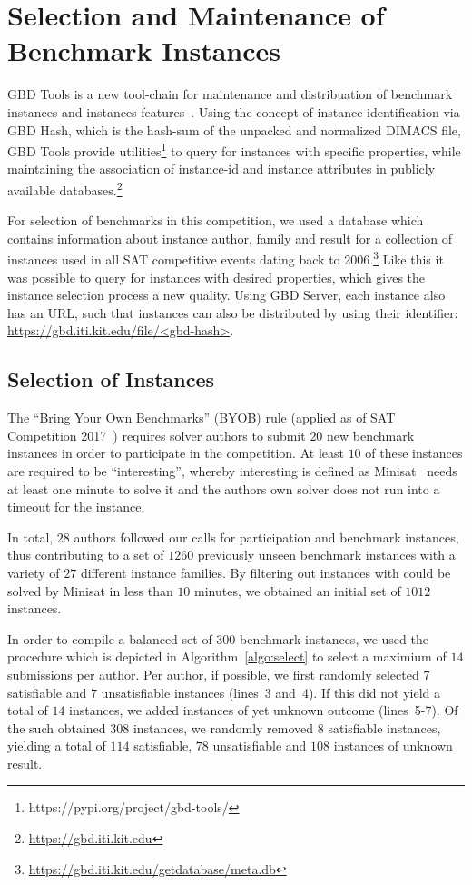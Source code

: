 \documentclass{elsarticle}
\begin{document}
\section{Selection and Maintenance of Benchmark Instances}

GBD Tools is a new tool-chain for maintenance and distribuation of benchmark instances and instances features~\cite{Iser:2018:GBD}. 
Using the concept of instance identification via GBD Hash, which is the hash-sum of the unpacked and normalized DIMACS file, GBD Tools provide utilities\footnote{https://pypi.org/project/gbd-tools/} to query for instances with specific properties, while maintaining the association of instance-id and instance attributes in publicly available databases.\footnote{\url{https://gbd.iti.kit.edu}}

For selection of benchmarks in this competition, we used a database which contains information about instance author, family and result for a collection of instances used in all SAT competitive events dating back to 2006.\footnote{\url{https://gbd.iti.kit.edu/getdatabase/meta.db}} 
Like this it was possible to query for instances with desired properties, which gives the instance selection process a new quality. 
Using GBD Server, each instance also has an URL, such that instances can also be distributed by using their identifier: \url{https://gbd.iti.kit.edu/file/<gbd-hash>}.


\subsection{Selection of Instances}

The ``Bring Your Own Benchmarks'' (BYOB) rule (applied as of SAT Competition 2017~\cite{SC2017}) requires solver authors to submit $20$ new benchmark instances in order to participate in the competition. At least $10$ of these instances are required to be ``interesting'', whereby interesting is defined as Minisat~\cite{Niklas:2003:Minisat} needs at least one minute to solve it and the authors own solver does not run into a timeout for the instance. 

In total, $28$ authors followed our calls for participation and benchmark instances, thus contributing to a set of $1260$ previously unseen benchmark instances with a variety of $27$ different instance families. 
By filtering out instances with could be solved by Minisat in less than $10$ minutes, we obtained an initial set of $1012$ instances. 

In order to compile a balanced set of $300$ benchmark instances, we used the procedure which is depicted in Algorithm~\ref{algo:select} to select a maximium of $14$ submissions per author. 
Per author, if possible, we first randomly selected $7$ satisfiable and $7$ unsatisfiable instances (lines~3 and~4). 
If this did not yield a total of $14$ instances, we added instances of yet unknown outcome (lines~5-7). 
Of the such obtained $308$ instances, we randomly removed $8$ satisfiable instances, yielding a total of $114$ satisfiable, $78$ unsatisfiable and $108$ instances of unknown result. 
\end{document}
